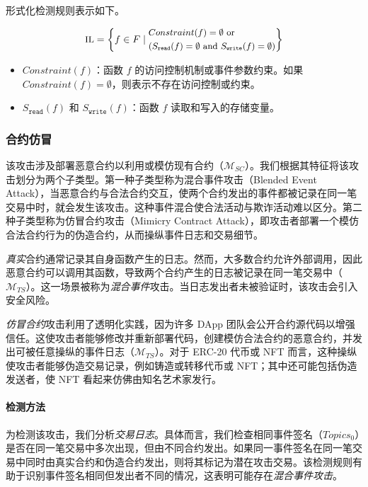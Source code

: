 形式化检测规则表示如下。

\begin{equation}
\small
\text{IL} = \left\{
f \in F \mid
\begin{aligned}
  & Constraint(f) = \emptyset \text{ or } \\
  & (S_{\texttt{read}}(f) = \emptyset \text{ and } S_{\texttt{write}}(f) = \emptyset)
\end{aligned}
\right\}
\end{equation}


\begin{itemize}
    \item \( Constraint(f) \)：函数 \( f \) 的访问控制机制或事件参数约束。如果 \( Constraint(f) = \emptyset \)，则表示不存在访问控制或约束。
    \item \( S_{\texttt{read}}(f) \) 和 \( S_{\texttt{write}}(f) \)：函数 \( f \) 读取和写入的存储变量。
\end{itemize}

\subsubsection{合约仿冒}\label{vec:attack3}

该攻击涉及部署恶意合约以利用或模仿现有合约（\(\bm{\mathcal{M}}_{SC}\)）。我们根据其特征将该攻击划分为两个子类型。第一种子类型称为混合事件攻击（Blended Event Attack），当恶意合约与合法合约交互，使两个合约发出的事件都被记录在同一笔交易中时，就会发生该攻击。这种事件混合使合法活动与欺诈活动难以区分。第二种子类型称为仿冒合约攻击（Mimicry Contract Attack），即攻击者部署一个模仿合法合约行为的伪造合约，从而操纵事件日志和交易细节。


\emph{真实}合约通常记录其自身函数产生的日志。然而，大多数合约允许外部调用，因此恶意合约可以调用其函数，导致两个合约产生的日志被记录在同一笔交易中（\(\bm{\mathcal{M}}_{TS}\)）。这一场景被称为\emph{混合事件}攻击。当日志发出者未被验证时，该攻击会引入安全风险。

\emph{仿冒合约}攻击利用了透明化实践，因为许多 DApp 团队会公开合约源代码以增强信任。这使攻击者能够修改并重新部署代码，创建模仿合法合约的恶意合约，并发出可被任意操纵的事件日志（\(\bm{\mathcal{M}}_{TS}\)）。对于 ERC-20 代币或 NFT 而言，这种操纵使攻击者能够伪造交易记录，例如铸造或转移代币或 NFT；其中还可能包括伪造发送者，使 NFT 看起来仿佛由知名艺术家发行。

\paragraph{检测方法}
为检测该攻击，我们分析\emph{交易日志}。具体而言，我们检查相同事件签名（\( Topics_0 \)）是否在同一笔交易中多次出现，但由不同合约发出。如果同一事件签名在同一笔交易中同时由真实合约和伪造合约发出，则将其标记为潜在攻击交易。该检测规则有助于识别事件签名相同但发出者不同的情况，这表明可能存在\emph{混合事件攻击}。


